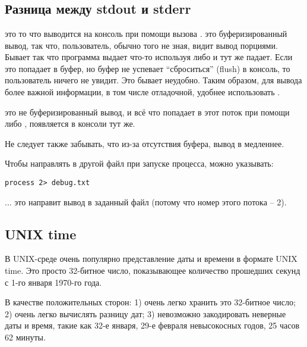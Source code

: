 ﻿\section{}



\subsection{Разница между stdout и stderr}

 это то что выводится на консоль при помощи вызова .
 это буферизированный вывод,
так что, пользователь, обычно того не зная, видит вывод порциями. Бывает так что программа выдает
что-то используя  либо  и тут же падает.
Если это попадает в буфер, но буфер не успевает
``сброситься'' (flush) в консоль, то пользователь ничего не увидит. Это бывает неудобно.
Таким образом, для вывода более важной информации, в том числе отладочной, удобнее использовать .

 это не буферизированный вывод, и всё что попадает в этот поток при помощи 
 либо , появляется в консоли тут же.

Не следует также забывать, что из-за отсутствия буфера, вывод в  медленнее.

Чтобы направлять  в другой файл при запуске процесса, можно указывать:

\begin{lstlisting}
process 2> debug.txt
\end{lstlisting}

... это направит вывод  в заданный файл (потому что номер этого потока -- 2).

\subsection{UNIX time}

В UNIX-среде очень популярно представление даты и времени в формате UNIX time.
Это просто 32-битное число, показывающее
количество прошедших секунд с 1-го января 1970-го года.

В качестве положительных сторон: 1) очень легко хранить это 32-битное число; 2) очень легко вычислять разницу дат;
3) невозможно закодировать неверные даты и время, такие как 32-е января, 29-е февраля невысокосных годов, 
25 часов 62 минуты.

